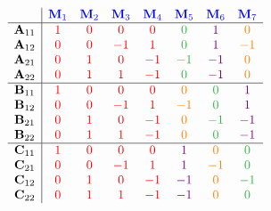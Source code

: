 \begin{multicols}{2}
        \columnbreak
        
        \setlength{\arraycolsep}{3pt}
        \[\begin{array}{c|ccccccc}
                & \color{blue} \mathbf{M}_1 & \color{blue} \mathbf{M}_2 & \color{blue} \mathbf{M}_3 & \color{blue} \mathbf{M}_4 & \color{blue} \mathbf{M}_5 & \color{blue} \mathbf{M}_6 & \color{blue} \mathbf{M}_7 \\
                \hline
                \mathbf{A}_{11} & \color{red} 1 & \color{red} 0 & \color{red} 0 & \color{red} 0  & \color{mycustomgreen} 0 &  \color{violet} 1 &  \color{orange} 0 \\
                \mathbf{A}_{12} & \color{red} 0 & \color{red} 0 & \color{red} -1 & \color{red} 1 & \color{mycustomgreen} 0 &  \color{violet} 1 &  \color{orange} -1 \\
                \mathbf{A}_{21} & \color{red} 0 & \color{red} 1 & \color{red} 0 & \color{red} -1 & \color{mycustomgreen} -1 & \color{violet} -1 & \color{orange} 0 \\
                \mathbf{A}_{22} & \color{red} 0 & \color{red} 1 & \color{red} 1 & \color{red} -1 & \color{mycustomgreen} 0 &  \color{violet} -1 & \color{orange} 0 \\
                \hline
                \mathbf{B}_{11} & \color{red} 1 & \color{red} 0 & \color{red} 0 & \color{red} 0  & \color{orange} 0 &  \color{mycustomgreen} 0 &  \color{violet} 1 \\
                \mathbf{B}_{12} & \color{red} 0 & \color{red} 0 & \color{red} -1 & \color{red} 1 & \color{orange} -1 & \color{mycustomgreen} 0 &  \color{violet} 1 \\
                \mathbf{B}_{21} & \color{red} 0 & \color{red} 1 & \color{red} 0 & \color{red} -1 & \color{orange} 0 &  \color{mycustomgreen} -1 & \color{violet} -1 \\
                \mathbf{B}_{22} & \color{red} 0 & \color{red} 1 & \color{red} 1 & \color{red} -1 & \color{orange} 0 &  \color{mycustomgreen} 0 &  \color{violet} -1 \\
                \hline
                \mathbf{C}_{11} & \color{red} 1 & \color{red} 0 & \color{red} 0 & \color{red} 0  & \color{violet} 1 &  \color{orange} 0 &  \color{mycustomgreen} 0 \\
                \mathbf{C}_{21} & \color{red} 0 & \color{red} 0 & \color{red} -1 & \color{red} 1 & \color{violet} 1 &  \color{orange} -1 & \color{mycustomgreen} 0 \\
                \mathbf{C}_{12} & \color{red} 0 & \color{red} 1 & \color{red} 0 & \color{red} -1 & \color{violet} -1 & \color{orange} 0 &  \color{mycustomgreen} -1 \\
                \mathbf{C}_{22} & \color{red} 0 & \color{red} 1 & \color{red} 1 & \color{red} -1 & \color{violet} -1 & \color{orange} 0 &  \color{mycustomgreen} 0 \\
        \end{array}\]    
    \end{multicols}

